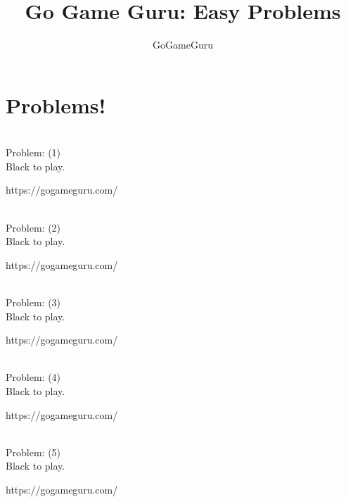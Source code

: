 \documentclass[11pt]{article}
\title{Go Game Guru: Easy Problems}
\author{GoGameGuru}
\date{ }
\begin{document}
\maketitle
\tableofcontents
\part{Problems!}
\begin{minipage}[t]{0.5\textwidth}
  {\centering
  
\\
Problem: (1)\\
Black to play.

https://gogameguru.com/\\
  }
\end{minipage}
\begin{minipage}[t]{0.5\textwidth}
  {\centering
  
\\
Problem: (2)\\
Black to play.

https://gogameguru.com/\\
  }
\end{minipage}
\begin{minipage}[t]{0.5\textwidth}
  {\centering
  
\\
Problem: (3)\\
Black to play.

https://gogameguru.com/\\
  }
\end{minipage}
\begin{minipage}[t]{0.5\textwidth}
  {\centering
  
\\
Problem: (4)\\
Black to play.

https://gogameguru.com/\\
  }
\end{minipage}
\begin{minipage}[t]{0.5\textwidth}
  {\centering
  
\\
Problem: (5)\\
Black to play.

https://gogameguru.com/\\
  }
\end{minipage}
\end{document}
